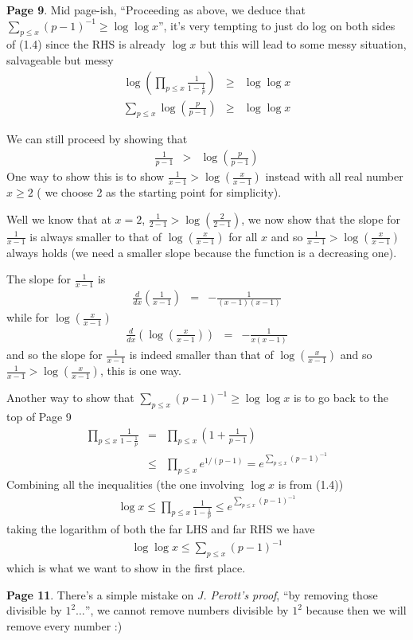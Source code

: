 \documentclass[aps,preprint,preprintnumbers,nofootinbib,showpacs,prd]{revtex4-1}
\newcommand{\nbea}{\begin{eqnarray*}}
\newcommand{\neea}{\end{eqnarray*}}
\begin{document}
{\bf Page 9}. Mid page-ish, ``Proceeding as above, we deduce that $\sum_{p\le x}(p-1)^{-1} \ge \log \log x$'', it's very tempting to just do log on both sides of (1.4) since the RHS is already $\log x$ but this will lead to some messy situation, salvageable but messy
%
\nbea
\log \left ( \prod_{p\le x} \frac{1}{1 - \frac{1}{p}} \right ) & \ge & \log \log x \\
\sum_{p\le x} \log \left (\frac{p}{p-1}\right ) & \ge & \log \log x
\neea
%

We can still proceed by showing that
%
\nbea
\frac{1}{p - 1} & > & \log \left (\frac{p}{p-1}\right )
\neea
%
One way to show this is to show $\frac{1}{x - 1} > \log \left (\frac{x}{x-1}\right )$ instead with all real number $x \ge 2$ ( we choose 2 as the starting point for simplicity).

Well we know that at $x = 2$, $\frac{1}{2 - 1} > \log \left (\frac{2}{2-1}\right )$, we now show that the slope for $\frac{1}{x - 1}$ is always smaller to that of $\log \left (\frac{x}{x-1}\right )$ for all $x$ and so $\frac{1}{x - 1} > \log \left (\frac{x}{x-1}\right )$ always holds (we need a smaller slope because the function is a decreasing one).

The slope for $\frac{1}{x - 1}$ is
%
\nbea
\frac{d}{dx}\left( \frac{1}{x - 1} \right ) & = & -\frac{1}{(x-1)(x-1)}
\neea
%
while for $\log \left (\frac{x}{x-1}\right )$
%
\nbea
\frac{d}{dx} \left (\log \left (\frac{x}{x-1}\right ) \right ) & = & -\frac{1}{x(x-1)}
\neea
%
and so the slope for $\frac{1}{x - 1}$ is indeed smaller than that of $\log \left (\frac{x}{x-1}\right )$ and so $\frac{1}{x - 1} > \log \left (\frac{x}{x-1}\right )$, this is one way.

Another way to show that $\sum_{p\le x}(p-1)^{-1} \ge \log \log x$ is to go back to the top of Page 9
%
\nbea
\prod_{p \le x} \frac{1}{1 - \frac{1}{p}} & = & \prod_{p \le x} \left ( 1 + \frac{1}{p - 1} \right ) \\
& \le & \prod_{p \le x} e^{1/(p-1)} = e^{\sum_{p\le x}(p-1)^{-1}}
\neea
%
Combining all the inequalities (the one involving $\log x$ is from (1.4))
%
\nbea
\log x \le \prod_{p \le x} \frac{1}{1 - \frac{1}{p}} \le e^{\sum_{p\le x}(p-1)^{-1}}
\neea
%
taking the logarithm of both the far LHS and far RHS we have
%
\nbea
\log \log x \le \sum_{p\le x}(p-1)^{-1}
\neea
%
which is what we want to show in the first place.

{\bf Page 11}. There's a simple mistake on {\it J. Perott's proof}, ``by removing those divisible by $1^2 \dots$'', we cannot remove numbers divisible by $1^2$ because then we will remove every number :)
\end{document}
